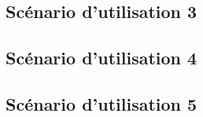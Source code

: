 \paragraph{}

\subsection{Scénario d'utilisation 3}
\paragraph{}

\subsection{Scénario d'utilisation 4}
\paragraph{}

\subsection{Scénario d'utilisation 5}
\paragraph{}

